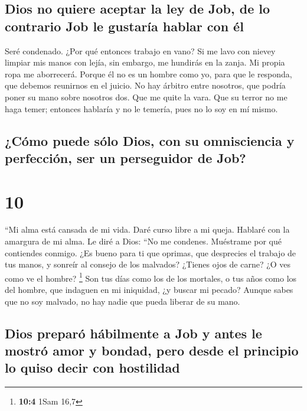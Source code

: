 \hypertarget{dios-no-quiere-aceptar-la-ley-de-job-de-lo-contrario-job-le-gustaruxeda-hablar-con-uxe9l}{%
\subsection{Dios no quiere aceptar la ley de Job, de lo contrario Job le
gustaría hablar con
él}\label{dios-no-quiere-aceptar-la-ley-de-job-de-lo-contrario-job-le-gustaruxeda-hablar-con-uxe9l}}

 Seré condenado. ¿Por qué entonces trabajo en vano?
 Si me lavo con nievey limpiar mis manos con lejía,
 sin embargo, me hundirás en la zanja. Mi propia ropa me
aborrecerá.  Porque él no es un hombre como yo, para que
le responda, que debemos reunirnos en el juicio.  No hay
árbitro entre nosotros, que podría poner su mano sobre nosotros dos.
 Que me quite la vara. Que su terror no me haga temer;
 entonces hablaría y no le temería, pues no lo soy en mí
mismo.

\hypertarget{cuxf3mo-puede-suxf3lo-dios-con-su-omnisciencia-y-perfecciuxf3n-ser-un-perseguidor-de-job}{%
\subsection{¿Cómo puede sólo Dios, con su omnisciencia y perfección, ser
un perseguidor de
Job?}\label{cuxf3mo-puede-suxf3lo-dios-con-su-omnisciencia-y-perfecciuxf3n-ser-un-perseguidor-de-job}}

\hypertarget{section-9}{%
\section{10}\label{section-9}}

 ``Mi alma está cansada de mi vida. Daré curso libre a mi
queja. Hablaré con la amargura de mi alma.  Le diré a
Dios: ``No me condenes. Muéstrame por qué contiendes conmigo.
 ¿Es bueno para ti que oprimas, que desprecies el trabajo
de tus manos, y sonreír al consejo de los malvados? 
¿Tienes ojos de carne? ¿O ves como ve el hombre? \footnote{\textbf{10:4}
  1Sam 16,7}  Son tus días como los de los mortales, o tus
años como los del hombre,  que indaguen en mi iniquidad,
¿y buscar mi pecado?  Aunque sabes que no soy malvado, no
hay nadie que pueda liberar de su mano.

\hypertarget{dios-preparuxf3-huxe1bilmente-a-job-y-antes-le-mostruxf3-amor-y-bondad-pero-desde-el-principio-lo-quiso-decir-con-hostilidad}{%
\subsection{Dios preparó hábilmente a Job y antes le mostró amor y
bondad, pero desde el principio lo quiso decir con
hostilidad}\label{dios-preparuxf3-huxe1bilmente-a-job-y-antes-le-mostruxf3-amor-y-bondad-pero-desde-el-principio-lo-quiso-decir-con-hostilidad}}

